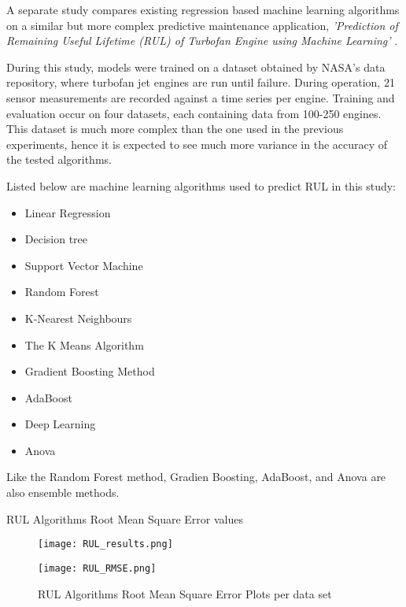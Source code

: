 A separate study compares existing regression based machine learning algorithms on a similar but more complex predictive maintenance application,
\textit{'Prediction of Remaining Useful Lifetime (RUL) of Turbofan Engine using Machine Learning'} \cite{RUL}.

During this study, models were trained on a dataset obtained by NASA's data repository, where turbofan jet engines are run until failure.
During operation, 21 sensor measurements are recorded against a time series per engine. 
Training and evaluation occur on four datasets, each containing data from 100-250 engines. 
This dataset is much more complex than the one used in the previous experiments,
hence it is expected to see much more variance in the accuracy of the tested algorithms. 


\enlargethispage{-5\baselineskip}
Listed below are machine learning algorithms used to predict RUL in this study:
\begin{itemize}
    \item Linear Regression
    \item Decision tree
    \item Support Vector Machine
    \item Random Forest
    \item K-Nearest Neighbours
    \item The K Means Algorithm
    \item Gradient Boosting Method
    \item AdaBoost
    \item Deep Learning
    \item Anova 
\end{itemize}
\bigskip

Like the Random Forest method, Gradien Boosting, AdaBoost, and Anova are also ensemble methods.


\begin{table}[h]
    \bigskip
    \caption{RUL Algorithms Root Mean Square Error values\cite{RUL}}
    \begin{figure}[H]
        \texttt{[image: RUL\_results.png]}
        \centering
    \end{figure}
    \label{table:RMSE}
\end{table}

\begin{figure}[H]
    \caption{RUL Algorithms Root Mean Square Error Plots per data set\cite{RUL}}
    \texttt{[image: RUL\_RMSE.png]}
    \label{fig:RMSE Plots}
\end{figure}

